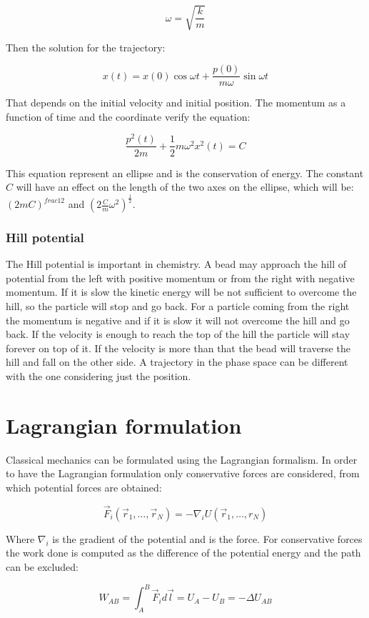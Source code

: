 		$$\omega = \sqrt{\frac{k}{m}}$$

		Then the solution for the trajectory:

		$$x(t) = x(0)\cos\omega t+ \frac{p(0)}{m\omega}\sin\omega t$$

		That depends on the initial velocity and initial position.
		The momentum as a function of time and the coordinate verify the equation:

		$$\frac{p^2(t)}{2m} +\frac{1}{2}m\omega^2x^2(t) = C$$

		This equation represent an ellipse and is the conservation of energy.
		The constant $C$ will have an effect on the length of the two axes on the ellipse, which will be: $(2mC)^{frac{1}{2}}$ and $(2\frac{C}{m}\omega^2)^{\frac{1}{2}}$.

		\subsubsection{Hill potential}
		The Hill potential is important in chemistry.
		A bead may approach the hill of potential from the left with positive momentum or from the right with negative momentum.
		If it is slow the kinetic energy will be not sufficient to overcome the hill, so the particle will stop and go back.
		For a particle coming from the right the momentum is negative and if it is slow it will not overcome the hill and go back.
		If the velocity is enough to reach the top of the hill the particle will stay forever on top of it.
		If the velocity is more than that the bead will traverse the hill and fall on the other side.
		A trajectory in the phase space can be different with the one considering just the position.

\section{Lagrangian formulation}
Classical mechanics can be formulated using the Lagrangian formalism.
In order to have the Lagrangian formulation only conservative forces are considered, from which potential forces are obtained:

$$\vec{F}_i(\vec{r}_1, \dots, \vec{r}_N) = -\nabla_i U(\vec{r}_1, \dots, r_N)$$

Where $\nabla_i$ is the gradient of the potential and is the force.
For conservative forces the work done is computed as the difference of the potential energy and the path can be excluded:

$$W_{AB} = \int_A^B\vec{F}_id\vec{l} = U_A-U_B = -\Delta U_{AB}$$

